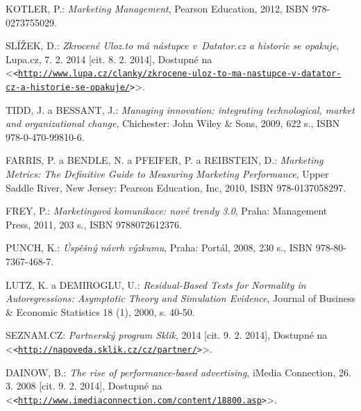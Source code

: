 \documentclass[12pt,twoside,openany]{fithesis}
\let\origurl\url
\def\url#1{\texttt{<\origurl{#1}>}}
\begin{document}
\begin{thebibliography}{99}

KOTLER, P.: \emph{Marketing Management}, Pearson Education, 2012, ISBN 978-0273755029. 


SLÍŽEK, D.: \emph{Zkrocené Uloz.to má nástupce v~Datator.cz a historie se opakuje}, Lupa.cz, 7. 2. 2014 [cit. 8. 2. 2014], Dostupné na {\textless}\url{http://www.lupa.cz/clanky/zkrocene-uloz-to-ma-nastupce-v-datator-cz-a-historie-se-opakuje/}{\textgreater}. 


TIDD, J. a BESSANT, J.: \emph{Managing innovation: integrating technological, market and
      organizational change}, Chichester: John Wiley \& Sons, 2009, 622 s., ISBN 978-0-470-99810-6. 


FARRIS, P. a BENDLE, N. a PFEIFER, P. a REIBSTEIN, D.: \emph{Marketing Metrics: The Definitive Guide to Measuring Marketing
      Performance}, Upper Saddle River, New Jersey: Pearson Education,
        Inc, 2010, ISBN 978-0137058297.


FREY, P.: \emph{Marketingová komunikace: nové trendy 3.0}, Praha: Management Press, 2011, 203 s., ISBN 9788072612376. 


PUNCH, K.: \emph{Úspěšný návrh výzkumu}, Praha: Portál, 2008, 230 s., ISBN 978-80-7367-468-7. 


LUTZ, K. a DEMIROGLU, U.: \emph{Residual-Based Tests for Normality in Autoregressions: Asymptotic
      Theory and Simulation Evidence}, Journal of Business \& Economic Statistics 18
        (1), 2000, s. 40-50. 


SEZNAM.CZ: \emph{Partnerský program Sklik}, 2014 [cit. 9. 2. 2014], Dostupné na {\textless}\url{http://napoveda.sklik.cz/cz/partner/}{\textgreater}. 


DAINOW, B.: \emph{The rise of performance-based advertising}, iMedia Connection, 26. 3. 2008 [cit. 9. 2. 2014], Dostupné na {\textless}\url{http://www.imediaconnection.com/content/18800.asp}{\textgreater}. 


\end{thebibliography}
\end{document}

